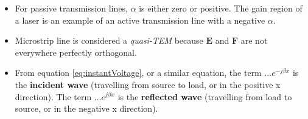 \documentclass[letterpaper, 10pt]{article}
\begin{document}
\begin{multicols*}{4}
  \begin{itemize}
  \item For passive transmission lines, $\alpha$ is either zero or
    positive. The gain region of a laser is an example of an active
    transmission line with a negative $\alpha$.
  \item Microstrip line is considered a \textit{quasi-TEM} because
    $\mathbf{E}$ and $\mathbf{F}$ are not everywhere perfectly
    orthogonal.
  \item From equation \eqref{eq:instantVoltage}, or a similar
    equation, the term $...e^{-j\beta x}$ is the \textbf{incident
      wave} (travelling from source to load, or in the positive x
    direction). The term $...e^{j\beta x}$ is the \textbf{reflected
      wave} (travelling from load to source, or in the negative x
    direction).
  \end{itemize}

\end{multicols*}
\end{document}
